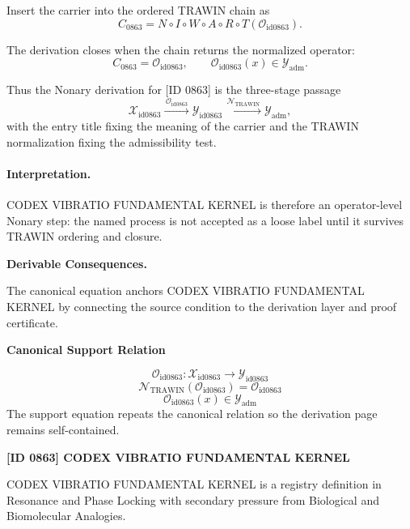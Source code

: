 Insert the carrier into the ordered TRAWIN chain as\[
C_{0863}=N\circ I\circ W\circ A\circ R\circ T(\mathcal{O}_{\mathrm{id0863}}).
\]

The derivation closes when the chain returns the normalized operator:\[
C_{0863}=\mathcal{O}_{\mathrm{id0863}},\qquad \mathcal{O}_{\mathrm{id0863}}(x)\in\mathcal{Y}_{\mathrm{adm}}.
\]

Thus the Nonary derivation for [ID 0863] is the three-stage passage
\[
\mathcal{X}_{\mathrm{id0863}}\xrightarrow{\,\mathcal{O}_{\mathrm{id0863}}\,} \mathcal{Y}_{\mathrm{id0863}}\xrightarrow{\,\mathcal{N}_{\mathrm{TRAWIN}}\,} \mathcal{Y}_{\mathrm{adm}},
\]
with the entry title fixing the meaning of the carrier and the TRAWIN normalization fixing the admissibility test.

\paragraph{Interpretation.} CODEX VIBRATIO FUNDAMENTAL KERNEL is therefore an operator-level Nonary step: the named process is not accepted as a loose label until it survives TRAWIN ordering and closure.

\par\vspace{0.35em}
\noindent\textbf{Derivable Consequences.}\quad
\begingroup
\footnotesize
\raggedright
The canonical equation anchors CODEX VIBRATIO FUNDAMENTAL KERNEL by connecting the source condition to the derivation layer and proof certificate.
\par\endgroup

\noindent\textbf{Canonical Support Relation}\par
\[
\mathcal{O}_{\mathrm{id0863}}:\mathcal{X}_{\mathrm{id0863}}\longrightarrow\mathcal{Y}_{\mathrm{id0863}}
\]
\[
\mathcal{N}_{\mathrm{TRAWIN}}(\mathcal{O}_{\mathrm{id0863}})=\mathcal{O}_{\mathrm{id0863}}
\]
\[
\mathcal{O}_{\mathrm{id0863}}(x)\in\mathcal{Y}_{\mathrm{adm}}
\]
\noindent The support equation repeats the canonical relation so the derivation page remains self-contained.\par

\clearpage
\noindent\textbf{[ID 0863] CODEX VIBRATIO FUNDAMENTAL KERNEL}\par
\vspace{0.35em}
\begingroup\small
{}
CODEX VIBRATIO FUNDAMENTAL KERNEL is a registry definition in Resonance and Phase Locking with secondary pressure from Biological and Biomolecular Analogies.


